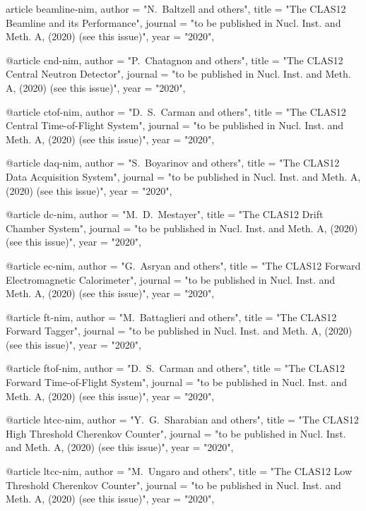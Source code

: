 article{
beamline-nim,
author         = "N.~Baltzell and others",
title          = "{The CLAS12 Beamline and its Performance}",
journal        = "to be published in Nucl. Inst. and Meth. A, (2020) (see this issue)",
year           = "2020",
}

@article{
cnd-nim,
author         = "P.~Chatagnon and others",
title          = "{The CLAS12 Central Neutron Detector}",
journal        = "to be published in Nucl. Inst. and Meth. A, (2020) (see this issue)",
year           = "2020",
}

@article{
ctof-nim,
author         = "D.~S.~Carman and others",
title          = "{The CLAS12 Central Time-of-Flight System}",
journal        = "to be published in Nucl. Inst. and Meth. A, (2020) (see this issue)",
year           = "2020",
}

@article{
daq-nim,
author         = "S.~Boyarinov and others",
title          = "{The CLAS12 Data Acquisition System}",
journal        = "to be published in Nucl. Inst. and Meth. A, (2020) (see this issue)",
year           = "2020",
}

@article{
dc-nim,
author         = "M.~D.~Mestayer",
title          = "{The CLAS12 Drift Chamber System}",
journal        = "to be published in Nucl. Inst. and Meth. A, (2020) (see this issue)",
year           = "2020",
}

@article{
ec-nim,
author         = "G.~Asryan and others",
title          = "{The CLAS12 Forward Electromagnetic Calorimeter}",
journal        = "to be published in Nucl. Inst. and Meth. A, (2020) (see this issue)",
year           = "2020",
}

@article{
ft-nim,
author         = "M.~Battaglieri and others",
title          = "{The CLAS12 Forward Tagger}",
journal        = "to be published in Nucl. Inst. and Meth. A, (2020) (see this issue)",
year           = "2020",
}

@article{
ftof-nim,
author         = "D.~S.~Carman and others",
title          = "{The CLAS12 Forward Time-of-Flight System}",
journal        = "to be published in Nucl. Inst. and Meth. A, (2020) (see this issue)",
year           = "2020",
}

@article{
htcc-nim,
author         = "Y.~G.~Sharabian and others",
title          = "{The CLAS12 High Threshold Cherenkov Counter}",
journal        = "to be published in Nucl. Inst. and Meth. A, (2020) (see this issue)",
year           = "2020",
}

@article{
ltcc-nim,
author         = "M.~Ungaro and others",
title          = "{The CLAS12 Low Threshold Cherenkov Counter}",
journal        = "to be published in Nucl. Inst. and Meth. A, (2020) (see this issue)",
year           = "2020",
}

